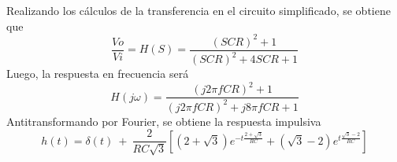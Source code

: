 \documentclass[a4paper]{article}
\begin{document}
Realizando los cálculos de la transferencia en el circuito simplificado, se obtiene que
\begin{equation}
 \frac{Vo}{Vi}=H(S)=\frac{ \left( SCR \right)^2 + 1}{\left( SCR \right)^2 + 4SCR + 1}
 \label{equ:Hhdes}
\end{equation} 
Luego, la respuesta en frecuencia será
\begin{equation}
 H(j\omega)=\frac{ \left( j 2\pi f CR \right)^2 + 1}{\left( j 2\pi f CR \right)^2 + j 8\pi fCR + 1}
 \label{equ:Hdejomega}
\end{equation}
Antitransformando por Fourier, se obtiene la respuesta impulsiva
\begin{equation}
 h(t)=\delta \left( t \right) \ + \ \frac{2}{RC\sqrt{3}} \left[ \left( 2 + \sqrt{3} \right) e^{-t\frac{2 + \sqrt{3}}{RC}} + \left( \sqrt{3} - 2 \right) e^{t\frac{\sqrt{3} - 2}{RC}} \right]
 \label{equ:hdet}
\end{equation}
\end{document}
